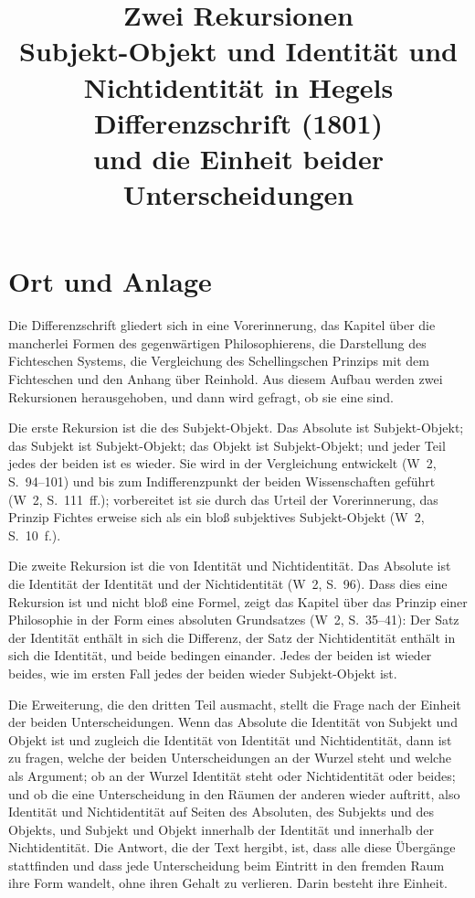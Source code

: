 \documentclass[11pt,a4paper]{article}
\title{Zwei Rekursionen\\[0.4em]
\large Subjekt-Objekt und Identität und Nichtidentität in Hegels Differenzschrift (1801)\\ und die Einheit beider Unterscheidungen}
\author{}
\date{}
\newcommand{\SO}{Subjekt-Objekt}
\newcommand{\Werke}[1]{(W~2, S.~#1)}
\begin{document}
\maketitle

\section{Ort und Anlage}

Die Differenzschrift gliedert sich in eine Vorerinnerung, das Kapitel über die mancherlei Formen des gegenwärtigen Philosophierens, die Darstellung des Fichteschen Systems, die Vergleichung des Schellingschen Prinzips mit dem Fichteschen und den Anhang über Reinhold. Aus diesem Aufbau werden zwei Rekursionen herausgehoben, und dann wird gefragt, ob sie eine sind.

Die erste Rekursion ist die des \SO{}. Das Absolute ist \SO{}; das Subjekt ist \SO{}; das Objekt ist \SO{}; und jeder Teil jedes der beiden ist es wieder. Sie wird in der Vergleichung entwickelt \Werke{94--101} und bis zum Indifferenzpunkt der beiden Wissenschaften geführt \Werke{111~ff.}; vorbereitet ist sie durch das Urteil der Vorerinnerung, das Prinzip Fichtes erweise sich als ein bloß subjektives \SO{} \Werke{10~f.}.

Die zweite Rekursion ist die von Identität und Nichtidentität. Das Absolute ist die Identität der Identität und der Nichtidentität \Werke{96}. Dass dies eine Rekursion ist und nicht bloß eine Formel, zeigt das Kapitel über das Prinzip einer Philosophie in der Form eines absoluten Grundsatzes \Werke{35--41}: Der Satz der Identität enthält in sich die Differenz, der Satz der Nichtidentität enthält in sich die Identität, und beide bedingen einander. Jedes der beiden ist wieder beides, wie im ersten Fall jedes der beiden wieder \SO{} ist.

Die Erweiterung, die den dritten Teil ausmacht, stellt die Frage nach der Einheit der beiden Unterscheidungen. Wenn das Absolute die Identität von Subjekt und Objekt ist und zugleich die Identität von Identität und Nichtidentität, dann ist zu fragen, welche der beiden Unterscheidungen an der Wurzel steht und welche als Argument; ob an der Wurzel Identität steht oder Nichtidentität oder beides; und ob die eine Unterscheidung in den Räumen der anderen wieder auftritt, also Identität und Nichtidentität auf Seiten des Absoluten, des Subjekts und des Objekts, und Subjekt und Objekt innerhalb der Identität und innerhalb der Nichtidentität. Die Antwort, die der Text hergibt, ist, dass alle diese Übergänge stattfinden und dass jede Unterscheidung beim Eintritt in den fremden Raum ihre Form wandelt, ohne ihren Gehalt zu verlieren. Darin besteht ihre Einheit.
\end{document}
